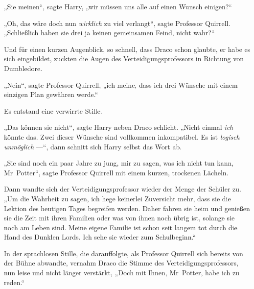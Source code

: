 „Sie meinen“, sagte Harry, „wir müssen uns alle auf einen Wunsch einigen?“

„Oh, das wäre doch nun \emph{wirklich} zu viel verlangt“, sagte Professor Quirrell.
„Schließlich haben sie drei ja keinen gemeinsamen Feind, nicht wahr?“

Und für einen kurzen Augenblick, so schnell, dass Draco schon glaubte, er habe es sich eingebildet, zuckten die Augen des Verteidigungsprofessors in Richtung von Dumbledore.

„Nein“, sagte Professor Quirrell, „ich meine, dass ich drei Wünsche mit einem einzigen Plan gewähren werde.“

Es entstand eine verwirrte Stille.

„Das können sie nicht“, sagte Harry neben Draco schlicht.
„Nicht einmal \emph{ich} könnte das. Zwei dieser Wünsche sind vollkommen inkompatibel. Es ist \emph{logisch unmöglich} —“, dann schnitt sich Harry selbst das Wort ab.

„Sie sind noch ein paar Jahre zu jung, mir zu sagen, was ich nicht tun kann, Mr~Potter“, sagte Professor Quirrell mit einem kurzen, trockenen Lächeln.

Dann wandte sich der Verteidigungsprofessor wieder der Menge der Schüler zu.
„Um die Wahrheit zu sagen, ich hege keinerlei Zuversicht mehr, dass sie die Lektion des heutigen Tages begreifen werden. Daher fahren sie heim und genießen sie die Zeit mit ihren Familien oder was von ihnen noch übrig ist, solange sie noch am Leben sind. Meine eigene Familie ist schon seit langem tot durch die Hand des Dunklen Lords. Ich sehe sie wieder zum Schulbeginn.“

In der sprachlosen Stille, die darauffolgte, als Professor Quirrell sich bereits von der Bühne abwandte, vernahm Draco die Stimme des Verteidigungsprofessors, nun leise und nicht länger verstärkt,
„Doch mit Ihnen, Mr~Potter, habe ich zu reden.“

